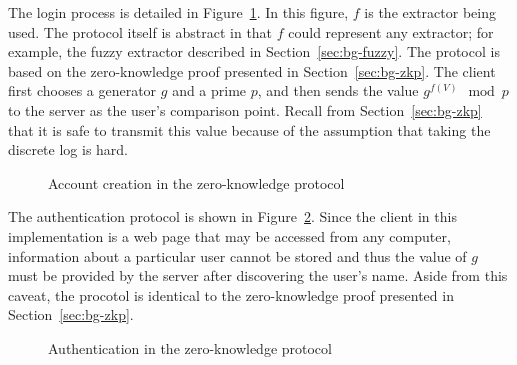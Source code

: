 \documentclass[11pt]{article}
\begin{document}
The login process is detailed in Figure~\ref{fig:zk_new}. In this figure, $f$ is the extractor being used. The protocol itself is abstract in that $f$ could represent any extractor; for example, the fuzzy extractor described in Section~\ref{sec:bg-fuzzy}. The protocol is based on the zero-knowledge proof presented in Section~\ref{sec:bg-zkp}. The client first chooses a generator $g$ and a prime $p$, and then sends the value $g^{f(V)}\mod p$ to the server as the user's comparison point. Recall from Section~\ref{sec:bg-zkp} that it is safe to transmit this value because of the assumption that taking the discrete log is hard.

\begin{figure}[h!]
\centering
{}
\caption{Account creation in the zero-knowledge protocol}
\label{fig:zk_new}
\end{figure}

The authentication protocol is shown in Figure~\ref{fig:zk_auth}. Since the client in this implementation is a web page that may be accessed from any computer, information about a particular user cannot be stored and thus the value of $g$ must be provided by the server after discovering the user's name. Aside from this caveat, the procotol is identical to the zero-knowledge proof presented in Section~\ref{sec:bg-zkp}.

\begin{figure}[h!]
\centering
{}
\caption{Authentication in the zero-knowledge protocol}
\label{fig:zk_auth}
\end{figure}
\end{document}
